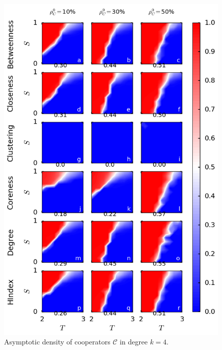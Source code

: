 \documentclass[preprint,12pt,3p]{elsarticle}
\begin{document}
\begin{figure}[htbp]
\centering
\includegraphics[width=13cm]{PowerlawK4TopRankTSPanel.png}

\caption{Asymptotic density of cooperators $\mathcal{C}$ in degree $k=4$.}
\label{PowerlawK4TopRankTSPanel}
\end{figure}
\end{document}
